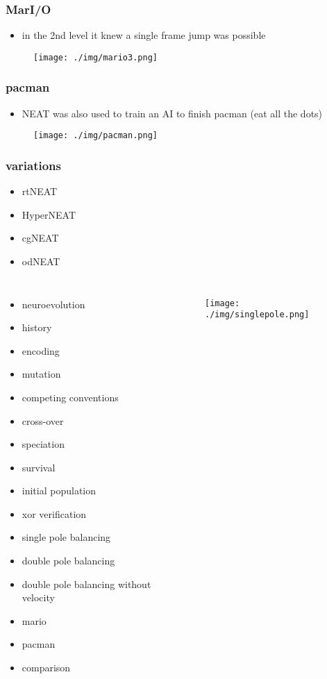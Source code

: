 \documentclass{beamer}
\begin{document}
\begin{frame}
\scriptsize
\frametitle{MarI/O}
\begin{itemize}
\item in the 2nd level it knew a single frame jump was possible
\end{itemize}
\begin{figure}
\texttt{[image: ./img/mario3.png]}
\end{figure}
\end{frame}

\begin{frame}
\scriptsize
\frametitle{pacman}
\begin{itemize}
\item NEAT was also used to train an AI to finish pacman (eat all the dots)
\end{itemize}
\begin{figure}
\texttt{[image: ./img/pacman.png]}
\end{figure}
\end{frame}


\begin{frame}
\frametitle{variations}
\begin{itemize}
\item rtNEAT
\item HyperNEAT
\item cgNEAT
\item odNEAT
\end{itemize}
\end{frame}

\begin{frame}
\scriptsize
\begin{columns}
\begin{itemize}
  \item neuroevolution
  \item history
  \item encoding
  \item mutation
  \item competing conventions
  \item cross-over
  \item speciation
  \item survival
  \item initial population
  \item xor verification
  \item single pole balancing
  \item double pole balancing
  \item double pole balancing without velocity
  \item mario
  \item pacman
  \item comparison
\end{itemize}
\begin{figure}
\texttt{[image: ./img/singlepole.png]}
\end{figure}
\end{columns}
\end{frame}
\end{document}
